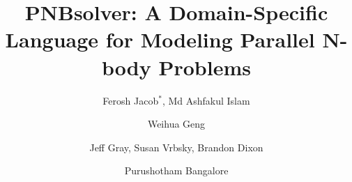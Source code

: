 \documentclass[draftclsnofoot]{elsarticle}
\begin{document}
\begin{frontmatter}
%
\title{PNBsolver: A Domain-Specific Language for Modeling Parallel N-body Problems
}




\author{Ferosh Jacob$^*$, Md Ashfakul Islam}
\address{Department of Computer Science, University of Alabama}

\author{Weihua Geng}
\address{Department of Mathematics, University of Alabama}

\author{Jeff Gray, Susan Vrbsky, Brandon Dixon}
\address{Department of Computer Science, University of Alabama}

\author{Purushotham Bangalore}
\address{Computer and Information Sciences,University of Alabama at Birmingham}
%

% 





\end{frontmatter}
\end{document}
